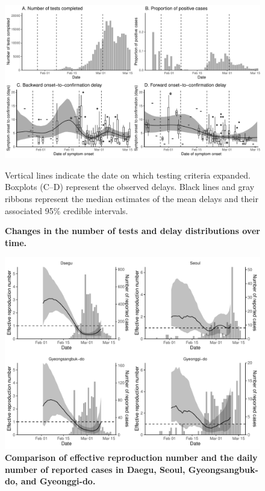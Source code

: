 \begin{figure}[!ht]
\includegraphics[width=\textwidth]{figure_report_delay.pdf}
\caption{
\textbf{Changes in the number of tests and delay distributions over time.}
}
Vertical lines indicate the date on which testing criteria expanded.
Boxplots (C--D) represent the observed delays.
Black lines and gray ribbons represent the median estimates of the mean delays and their associated 95\% credible intervals.
\end{figure}

\pagebreak

\begin{figure}[!ht]
\includegraphics[width=\textwidth]{figure_R_t_all.pdf}
\caption{
\textbf{Comparison of effective reproduction number and the daily number of reported cases in Daegu, Seoul, Gyeongsangbuk-do, and Gyeonggi-do.}
}
\end{figure}

